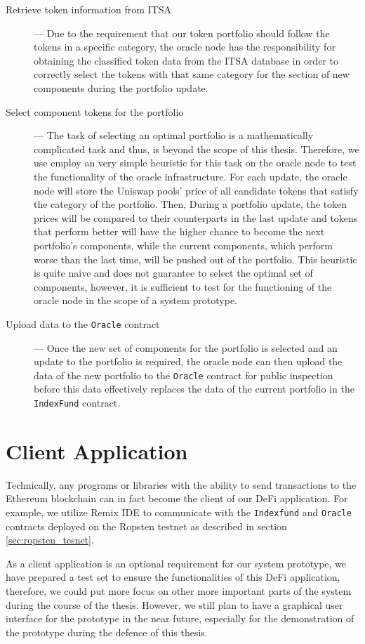 \begin{description}
  \item[Retrieve token information from ITSA] --- Due to the requirement that our token portfolio should follow the tokens in a specific category, the oracle node has the responsibility for obtaining the classified token data from the ITSA database in order to correctly select the tokens with that same category for the section of new components during the portfolio update. 
  
  \item[Select component tokens for the portfolio] --- The task of selecting an optimal portfolio is a mathematically complicated task and thus, is beyond the scope of this thesis. Therefore, we use employ an very simple heuristic for this task on the oracle node to test the functionality of the oracle infrastructure. For each update, the oracle node will store the Uniswap pools' price of all candidate tokens that satisfy the category of the portfolio. Then, During a portfolio update, the token prices will be compared to their counterparts in the last update and tokens that perform better will have the higher chance to become the next portfolio's components, while the current components, which perform worse than the last time, will be pushed out of the portfolio. This heuristic is quite naive and does not guarantee to select the optimal set of components, however, it is sufficient to test for the functioning of the oracle node in the scope of a system prototype.
  
  \item[Upload data to the \texttt{Oracle} contract] --- Once the new set of components for the portfolio is selected and an update to the portfolio is required, the oracle node can then upload the data of the new portfolio to the \texttt{Oracle} contract for public inspection before this data effectively replaces the data of the current portfolio in the \texttt{IndexFund} contract.
  
\end{description}


\section{Client Application}  \label{sec:cli}

Technically, any programs or libraries with the ability to send transactions to the Ethereum blockchain can in fact become the client of our DeFi application. For example, we utilize Remix IDE to communicate with the \texttt{Indexfund} and \texttt{Oracle} contracts deployed on the Ropsten testnet as described in section \ref{sec:ropsten_tesnet}.

As a client application is an optional requirement for our system prototype, we have prepared a test set to ensure the functionalities of this DeFi application, therefore, we could put more focus on other more important parts of the system during the course of the thesis. However, we still plan to have a graphical user interface for the prototype in the near future, especially for the demonstration of the prototype during the defence of this thesis.